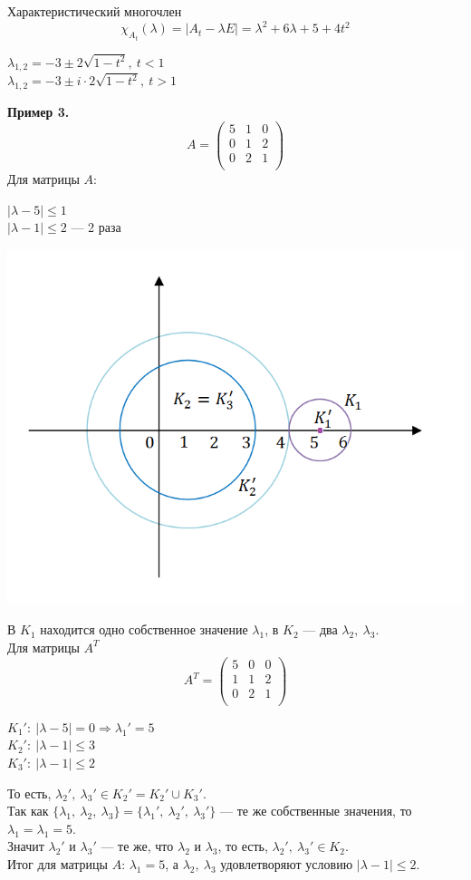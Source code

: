 \documentclass[12pt]{article}
\begin{document}
	Характеристический многочлен $$\chi_{A_t}(\lambda)=|A_t-\lambda E|=\lambda^2+6\lambda+5+4t^2$$
	\begin{center}
		$\lambda_{1,2}=-3\pm 2\sqrt{1-t^2},~t<1$\\
		$\lambda_{1,2}=-3\pm i\cdot 2\sqrt{1-t^2},~t>1$
	\end{center}
	\textbf{Пример 3.}\\
	\[A=\begin{pmatrix}
	5 & 1 & 0 \\
	0 & 1 & 2 \\
	0 & 2 & 1 \\
	\end{pmatrix}\]
	Для матрицы $A$:
	\begin{center}
		$|\lambda-5|\leqslant 1$\\
		$|\lambda-1|\leqslant 2$ --- 2 раза
	\end{center}
	\begin{center}
		\includegraphics[scale=0.8]{l9_6.png}
	\end{center}
	В $K_1$ находится одно собственное значение $\lambda_1$, в $K_2$ --- два $\lambda_2,~\lambda_3$.\\
	Для матрицы $A^T$
	\[A^T=\begin{pmatrix}
	5 & 0 & 0 \\
	1 & 1 & 2 \\
	0 & 2 & 1 \\
	\end{pmatrix}\]
	\begin{center}
		$K_1':~|\lambda-5|=0 \Rightarrow \lambda_1'=5$\\
		$K_2':~|\lambda-1|\leqslant 3$\\
		$K_3':~|\lambda-1|\leqslant 2$
	\end{center}
	То есть, $\lambda_2',~\lambda_3'\in K_2'=K_2'\cup K_3'$.\\
	Так как $\{\lambda_1,~\lambda_2,~\lambda_3\}=\{\lambda_1',~\lambda_2',~\lambda_3'\}$ --- те же собственные значения, то $\lambda_1=\lambda_1=5$.\\
	Значит $\lambda_2'$ и $\lambda_3'$ --- те же, что $\lambda_2$ и $\lambda_3$, то есть, $\lambda_2',~\lambda_3'\in K_2$.\\
	Итог для матрицы $A$: $\lambda_1=5$, а $\lambda_2,~\lambda_3$ удовлетворяют условию $|\lambda-1|\leqslant 2$.
\end{document}
